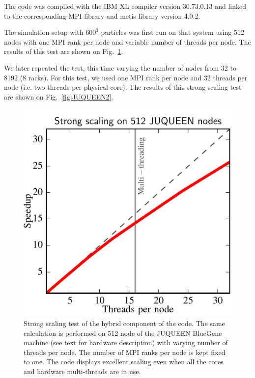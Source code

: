 \documentclass{sig-alternate-05-2015}
\begin{document}
The code was compiled with the IBM XL compiler version \textsc{30.73.0.13} and
linked to the corresponding MPI library and metis library
version \textsc{4.0.2}.

The simulation setup with $600^3$ particles was first run on that system using
512 nodes with one MPI rank per node and variable number of threads per
node. The results of this test are shown on Fig.~\ref{fig:JUQUEEN1}.

We later repeated the test, this time varying the number of nodes from 32 to
8192 (8 racks).  For this test, we used one MPI rank per node and 32 threads per
node (i.e. two threads per physical core). The results of this strong scaling
test are shown on Fig.~\ref{fig:JUQUEEN2}.


\begin{figure}
\centering
\includegraphics[width=\columnwidth]{Figures/scalingInNode}
\caption{Strong scaling test of the hybrid component of the code. The
  same calculation is performed on 512 node of the JUQUEEN BlueGene
  machine (see text for hardware description) with varying number of
  threads per node. The number of MPI ranks per node is kept fixed to
  one. The code displays excellent scaling even when all the cores and
  hardware multi-threads are in use. \label{fig:JUQUEEN1}}
\end{figure}  
\end{document}
